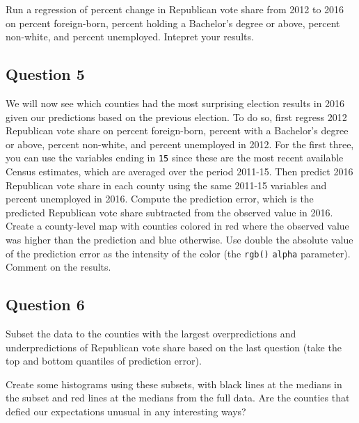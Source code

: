 \documentclass[]{article}
\begin{document}
Run a regression of percent change in Republican vote share from 2012 to
2016 on percent foreign-born, percent holding a Bachelor's degree or
above, percent non-white, and percent unemployed. Intepret your results.

\subsection{Question 5}\label{question-5}

We will now see which counties had the most surprising election results
in 2016 given our predictions based on the previous election. To do so,
first regress 2012 Republican vote share on percent foreign-born,
percent with a Bachelor's degree or above, percent non-white, and
percent unemployed in 2012. For the first three, you can use the
variables ending in \texttt{15} since these are the most recent
available Census estimates, which are averaged over the period 2011-15.
Then predict 2016 Republican vote share in each county using the same
2011-15 variables and percent unemployed in 2016. Compute the prediction
error, which is the predicted Republican vote share subtracted from the
observed value in 2016. Create a county-level map with counties colored
in red where the observed value was higher than the prediction and blue
otherwise. Use double the absolute value of the prediction error as the
intensity of the color (the \texttt{rgb()} \texttt{alpha} parameter).
Comment on the results.

\subsection{Question 6}\label{question-6}

Subset the data to the counties with the largest overpredictions and
underpredictions of Republican vote share based on the last question
(take the top and bottom quantiles of prediction error).

Create some histograms using these subsets, with black lines at the
medians in the subset and red lines at the medians from the full data.
Are the counties that defied our expectations unusual in any interesting
ways?
\end{document}
